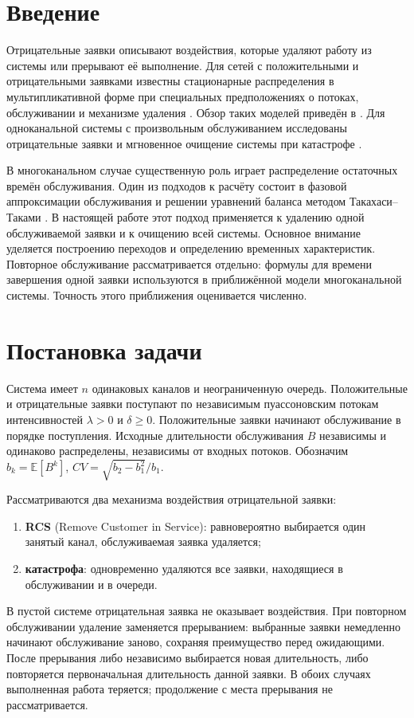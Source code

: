 \section{Введение}
Отрицательные заявки описывают воздействия, которые удаляют работу из системы или прерывают её выполнение. Для сетей с положительными и отрицательными заявками известны стационарные распределения в мультипликативной форме при специальных предположениях о потоках, обслуживании и механизме удаления \cite{gelenbe1991,gelenbe1992}. Обзор таких моделей приведён в \cite{artalejo2000}. Для одноканальной системы с произвольным обслуживанием исследованы отрицательные заявки \cite{harrison1996} и мгновенное очищение системы при катастрофе \cite{jain1996}.

В многоканальном случае существенную роль играет распределение остаточных времён обслуживания. Один из подходов к расчёту состоит в фазовой аппроксимации обслуживания и решении уравнений баланса методом Такахаси--Таками \cite{takahashi1976,ryzhikov2018ru}. В настоящей работе этот подход применяется к удалению одной обслуживаемой заявки и к очищению всей системы. Основное внимание уделяется построению переходов и определению временных характеристик. Повторное обслуживание рассматривается отдельно: формулы для времени завершения одной заявки используются в приближённой модели многоканальной системы. Точность этого приближения оценивается численно.

\section{Постановка задачи}
Система имеет \(n\) одинаковых каналов и неограниченную очередь. Положительные и отрицательные заявки поступают по независимым пуассоновским потокам интенсивностей \(\lambda>0\) и \(\delta\ge0\). Положительные заявки начинают обслуживание в порядке поступления. Исходные длительности обслуживания \(B\) независимы и одинаково распределены, независимы от входных потоков. Обозначим \(b_k=\mathbb E[B^k]\), \(CV=\sqrt{b_2-b_1^2}/b_1\).

Рассматриваются два механизма воздействия отрицательной заявки:
\begin{enumerate}[leftmargin=1.5em]
\item \textbf{RCS} (Remove Customer in Service): равновероятно выбирается один занятый канал, обслуживаемая заявка удаляется;
\item \textbf{катастрофа}: одновременно удаляются все заявки, находящиеся в обслуживании и в очереди.
\end{enumerate}
В пустой системе отрицательная заявка не оказывает воздействия. При повторном обслуживании удаление заменяется прерыванием: выбранные заявки немедленно начинают обслуживание заново, сохраняя преимущество перед ожидающими. После прерывания либо независимо выбирается новая длительность, либо повторяется первоначальная длительность данной заявки. В обоих случаях выполненная работа теряется; продолжение с места прерывания не рассматривается.


